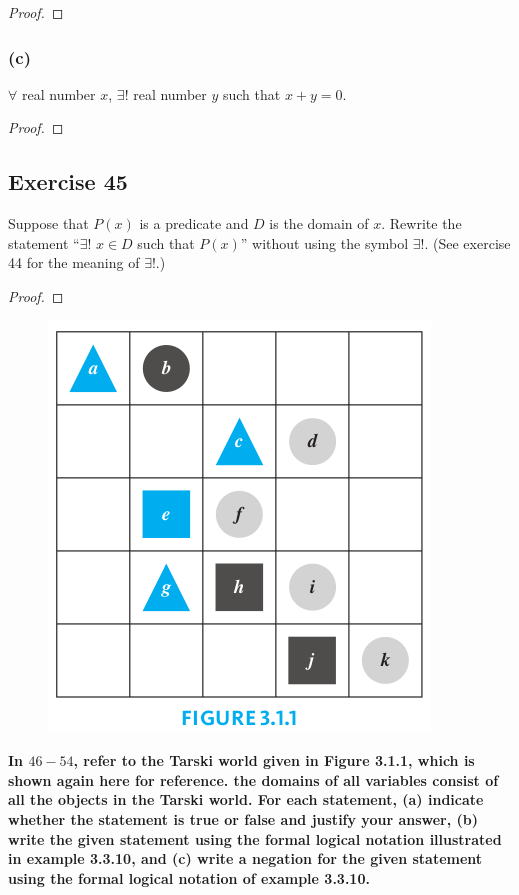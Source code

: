 \documentclass[14pt]{extarticle}
\newcommand{\fa}{\forall}
\newcommand{\te}{\exists}
\begin{document}
\begin{proof}

\end{proof}

\subsubsection{(c)}
$\fa$ real number $x$, $\te$! real number $y$ such that $x + y = 0$.

\begin{proof}

\end{proof}

\subsection{Exercise 45}
Suppose that $P(x)$ is a predicate and $D$ is the domain of $x$. Rewrite the statement “$\te$! $x \in D$ such that $P(x)$” without using the symbol $\te$!. (See exercise 44 for the meaning of $\te$!.)

\begin{proof}

\end{proof}

\begin{figure}[ht!]
\centering
\includegraphics[scale=0.4]{../images/3.1.1.png}
\end{figure}

{\bf \color{cyan} In $46-54$, refer to the Tarski world given in Figure 3.1.1, which is shown again here for reference. the domains of all variables consist of all the objects in the Tarski world. For each statement, (a) indicate whether the statement is true or false and justify your answer, (b) write the given statement using the formal logical notation illustrated in example 3.3.10, and (c) write a negation for the given statement using the formal logical notation of example 3.3.10.}
\end{document}
